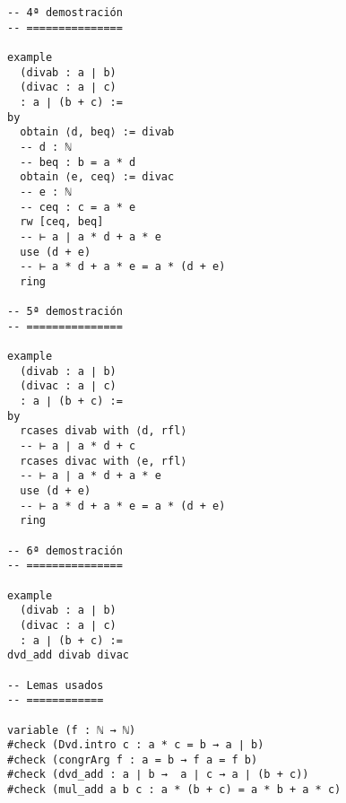 \begin{verbatim}
-- 4ª demostración
-- ===============

example
  (divab : a ∣ b)
  (divac : a ∣ c)
  : a ∣ (b + c) :=
by
  obtain ⟨d, beq⟩ := divab
  -- d : ℕ
  -- beq : b = a * d
  obtain ⟨e, ceq⟩ := divac
  -- e : ℕ
  -- ceq : c = a * e
  rw [ceq, beq]
  -- ⊢ a ∣ a * d + a * e
  use (d + e)
  -- ⊢ a * d + a * e = a * (d + e)
  ring

-- 5ª demostración
-- ===============

example
  (divab : a ∣ b)
  (divac : a ∣ c)
  : a ∣ (b + c) :=
by
  rcases divab with ⟨d, rfl⟩
  -- ⊢ a ∣ a * d + c
  rcases divac with ⟨e, rfl⟩
  -- ⊢ a ∣ a * d + a * e
  use (d + e)
  -- ⊢ a * d + a * e = a * (d + e)
  ring

-- 6ª demostración
-- ===============

example
  (divab : a ∣ b)
  (divac : a ∣ c)
  : a ∣ (b + c) :=
dvd_add divab divac

-- Lemas usados
-- ============

variable (f : ℕ → ℕ)
#check (Dvd.intro c : a * c = b → a ∣ b)
#check (congrArg f : a = b → f a = f b)
#check (dvd_add : a ∣ b →  a ∣ c → a ∣ (b + c))
#check (mul_add a b c : a * (b + c) = a * b + a * c)
\end{verbatim}

